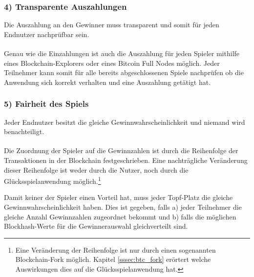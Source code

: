 \subsubsection{4) Transparente Auszahlungen}
Die Auszahlung an den Gewinner muss transparent und somit für jeden Endnutzer nachprüfbar sein.\\\\
Genau wie die Einzahlungen ist auch die Auszahlung für jeden Spieler mithilfe eines Blockchain-Explorers oder eines Bitcoin Full Nodes möglich. Jeder Teilnehmer kann somit für alle bereits abgeschlossenen Spiele nachprüfen ob die Anwendung sich korrekt verhalten und eine Auszahlung getätigt hat. 
\subsubsection{5) Fairheit des Spiels}
Jeder Endnutzer besitzt die gleiche Gewinnwahrscheinlichkeit und niemand wird benachteiligt.\\\\
Die Zuordnung der Spieler auf die Gewinnzahlen ist durch die Reihenfolge der Transaktionen in der Blockchain festgeschrieben. Eine nachträgliche Veränderung dieser Reihenfolge ist weder durch die Nutzer, noch durch die Glücksspielanwendung möglich.\footnote{Eine Veränderung der Reihenfolge ist nur durch einen sogenannten Blockchain-Fork möglich. Kapitel \ref{sssec:btc_fork} erörtert welche Auswirkungen dies auf die Glücksspielanwendung hat.}

Damit keiner der Spieler einen Vorteil hat, muss jeder Topf-Platz die gleiche Gewinnwahrscheinlichkeit haben.
Dies ist gegeben, falls a) jeder Teilnehmer die gleiche Anzahl Gewinnzahlen zugeordnet bekommt und b) falls die möglichen Blockhash-Werte für die Gewinnerauswahl gleichverteilt sind.\\

